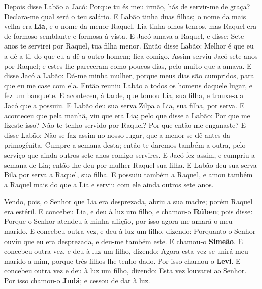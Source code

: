Depois disse Labão a Jacó: Porque tu és meu irmão, hás de
servir-me de graça? Declara-me qual será o teu salário. E
Labão tinha duas filhas; o nome da mais velha era \textbf{Lia}, e o
nome da menor Raquel. Lia tinha olhos tenros, mas Raquel era
de formoso semblante e formosa à vista. E Jacó amava a
Raquel, e disse: Sete anos te servirei por Raquel, tua filha menor.
Então disse Labão: Melhor é que eu a dê a ti, do que eu a dê
a outro homem; fica comigo. Assim serviu Jacó sete anos por
Raquel; e estes lhe pareceram como poucos dias, pelo muito que a
amava. E disse Jacó a Labão: Dá-me minha mulher, porque meus
dias são cumpridos, para que eu me case com ela. Então reuniu
Labão a todos os homens daquele lugar, e fez um banquete. E
aconteceu, à tarde, que tomou Lia, sua filha, e trouxe-a a Jacó que
a possuiu. E Labão deu sua serva Zilpa a Lia, sua filha, por
serva. E aconteceu que pela manhã, viu que era Lia; pelo que
disse a Labão: Por que me fizeste isso? Não te tenho servido por
Raquel? Por que então me enganaste? E disse Labão: Não se faz
assim no nosso lugar, que a menor se dê antes da primogênita.
Cumpre a semana desta; então te daremos também a outra, pelo
serviço que ainda outros sete anos comigo servires. E Jacó
fez assim, e cumpriu a semana de Lia; então lhe deu por mulher
Raquel sua filha. E Labão deu sua serva Bila por serva a
Raquel, sua filha. E possuiu também a Raquel, e amou também a
Raquel mais do que a Lia e serviu com ele ainda outros sete anos.

Vendo, pois, o Senhor que Lia era desprezada, abriu a sua madre;
porém Raquel era estéril. E concebeu Lia, e deu à luz um
filho, e chamou-o \textbf{Rúben}; pois disse: Porque o Senhor
atendeu à minha aflição, por isso agora me amará o meu marido.
E concebeu outra vez, e deu à luz um filho, dizendo:
Porquanto o Senhor ouviu que eu era desprezada, e deu-me também
este. E chamou-o \textbf{Simeão}. E concebeu outra vez, e deu
à luz um filho, dizendo: Agora esta vez se unirá meu marido a mim,
porque três filhos lhe tenho dado. Por isso chamou-o \textbf{Levi}.
E concebeu outra vez e deu à luz um filho, dizendo: Esta vez
louvarei ao Senhor. Por isso chamou-o \textbf{Judá}; e cessou de dar
à luz.

\smallskip

